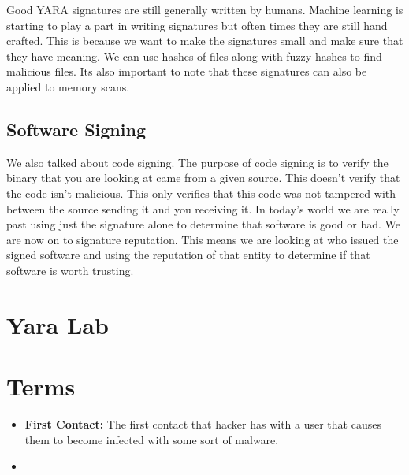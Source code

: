 \documentclass[letterpaper, onecolumn,10pt]{IEEEtran}
\begin{document}
            Good YARA signatures are still generally written by humans. Machine learning is starting to play a part in writing signatures but often times they are still hand crafted. This is because we want to make the signatures small and make sure that they have meaning. We can use hashes of files along with fuzzy hashes to find malicious files. Its also important to note that these signatures can also be applied to memory scans.\\
            
            \subsection{Software Signing}
            We also talked about code signing. The purpose of code signing is to verify the binary that you are looking at came from a given source. This doesn't verify that the code isn't malicious. This only verifies that this code was not tampered with between the source sending it and you receiving it. In today's world we are really past using just the signature alone to determine that software is good or bad. We are now on to signature reputation. This means we are looking at who issued the signed software and using the reputation of that entity to determine if that software is worth trusting.\\ 

        \section{Yara Lab}
        
        
        \section{Terms}
            \begin{itemize}
                \item \textbf{First Contact:} The first contact that hacker has with a user that causes them to become infected with some sort of malware.\\
                \item \textbf{}
            \end{itemize}

		
\end{document}
